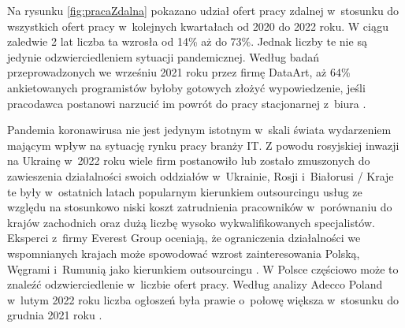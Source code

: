 Na rysunku \ref{fig:pracaZdalna} pokazano udział ofert pracy zdalnej w~stosunku do wszystkich ofert pracy w~kolejnych kwartałach od 2020 do 2022 roku.
W ciągu zaledwie 2 lat liczba ta wzrosła od 14\% aż do 73\%.
Jednak liczby te nie są jedynie odzwierciedleniem sytuacji pandemicznej. Według badań przeprowadzonych we wrześniu 2021 roku przez firmę DataArt, aż 64\% ankietowanych programistów byłoby gotowych złożyć wypowiedzenie, jeśli pracodawca postanowi narzucić im powrót do pracy stacjonarnej z~biura \cite{pasterczyk-2021}.



Pandemia koronawirusa nie jest jedynym istotnym w~skali świata wydarzeniem mającym wpływ na sytuację rynku pracy branży IT.
Z powodu rosyjskiej inwazji na Ukrainę w~2022 roku wiele firm postanowiło lub zostało zmuszonych do zawieszenia działalności swoich oddziałów w~Ukrainie, Rosji i~Białorusi \cite{blaszczak-2022}/
Kraje te były w~ostatnich latach popularnym kierunkiem outsourcingu usług ze względu na stosunkowo niski koszt zatrudnienia pracowników w~porównaniu do krajów zachodnich oraz dużą liczbę wysoko wykwalifikowanych specjalistów.
Eksperci z~firmy Everest Group oceniają, że ograniczenia działalności we wspomnianych krajach może spowodować wzrost zainteresowania Polską, Węgrami i~Rumunią jako kierunkiem outsourcingu \cite{overby-2022}.
W Polsce częściowo może to znaleźć odzwierciedlenie w~liczbie ofert pracy.
Według analizy Adecco Poland w~lutym 2022 roku liczba ogłoszeń była prawie o~połowę większa w~stosunku do grudnia 2021 roku \cite{blaszczak-2022}.

\thispagestyle{normal}
